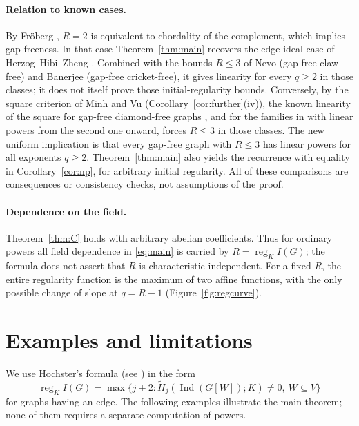 \documentclass[11pt,a4paper]{article}
\theoremstyle{definition}
\newcommand{\reg}{\operatorname{reg}}
\newcommand{\Ind}{\operatorname{Ind}}
\newcommand{\Ht}{\widetilde H}
\begin{document}
\paragraph{Relation to known cases.}
By Fr\"oberg \cite{Fro}, $R=2$ is equivalent to chordality of the complement, which implies gap-freeness. In that case Theorem~\ref{thm:main} recovers the edge-ideal case of Herzog--Hibi--Zheng \cite{HHZ}. Combined with the bounds $R\leq3$ of Nevo \cite{Nevo} (gap-free claw-free) and Banerjee \cite{Ban} (gap-free cricket-free), it gives linearity for every $q\geq2$ in those classes; it does not itself prove those initial-regularity bounds. Conversely, by the square criterion of Minh and Vu \cite{MV} (Corollary~\ref{cor:further}(iv)), the known linearity of the square for gap-free diamond-free graphs \cite{Erey18}, and for the families in \cite{E26,E3,D4} with linear powers from the second one onward, forces $R\leq3$ in those classes. The new uniform implication is that every gap-free graph with $R\leq3$ has linear powers for all exponents $q\geq2$. Theorem~\ref{thm:main} also yields the recurrence with equality in Corollary~\ref{cor:np}, for arbitrary initial regularity. All of these comparisons are consequences or consistency checks, not assumptions of the proof.

\paragraph{Dependence on the field.}
Theorem~\ref{thm:C} holds with arbitrary abelian coefficients. Thus for ordinary powers all field dependence in \eqref{eq:main} is carried by $R=\reg_K I(G)$; the formula does not assert that $R$ is characteristic-independent. For a fixed $R$, the entire regularity function is the maximum of two affine functions, with the only possible change of slope at $q=R-1$ (Figure~\ref{fig:regcurve}).

\section{Examples and limitations}\label{sec:examples}
We use Hochster's formula (see \cite[Corollary 5.12]{MS}) in the form
\[
 \reg_K I(G)=\max\{j+2:\Ht_j(\Ind(G[W]);K)\ne0,\ W\subseteq V\}
\]
for graphs having an edge. The following examples illustrate the main theorem; none of them requires a separate computation of powers.
\end{document}
